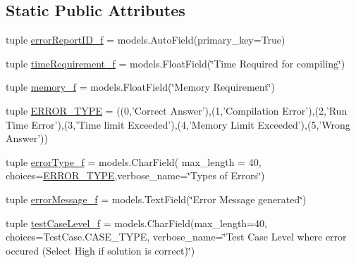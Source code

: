 \subsection*{Static Public Attributes}
\begin{DoxyCompactItemize}
\item 
tuple \hyperlink{class_ecodena_1_1_attempt_1_1models_1_1_error_report_a2af69996b9b6d05f1bdfeff5d05f1fc6}{errorReportID\_\-f} = models.AutoField(primary\_\-key=True)
\item 
tuple \hyperlink{class_ecodena_1_1_attempt_1_1models_1_1_error_report_aafea830ed4b75d8af62b447a58a23fdb}{timeRequirement\_\-f} = models.FloatField(\char`\"{}Time Required for compiling\char`\"{})
\item 
tuple \hyperlink{class_ecodena_1_1_attempt_1_1models_1_1_error_report_a6251188760c30f622c68f126ba37c765}{memory\_\-f} = models.FloatField(\char`\"{}Memory Requirement\char`\"{})
\item 
tuple \hyperlink{class_ecodena_1_1_attempt_1_1models_1_1_error_report_a83fffbd11c0969a40133740c84f41bc1}{ERROR\_\-TYPE} = ((0,'Correct Answer'),(1,'Compilation Error'),(2,'Run Time Error'),(3,'Time limit Exceeded'),(4,'Memory Limit Exceeded'),(5,'Wrong Answer'))
\item 
tuple \hyperlink{class_ecodena_1_1_attempt_1_1models_1_1_error_report_a2206247ced5f221ac3622b203c27d98a}{errorType\_\-f} = models.CharField( max\_\-length = 40, choices=\hyperlink{class_ecodena_1_1_attempt_1_1models_1_1_error_report_a83fffbd11c0969a40133740c84f41bc1}{ERROR\_\-TYPE},verbose\_\-name=\char`\"{}Types of Errors\char`\"{})
\item 
tuple \hyperlink{class_ecodena_1_1_attempt_1_1models_1_1_error_report_ac3c6ddeb8bb514c31ef17a8b2c61fbbe}{errorMessage\_\-f} = models.TextField(\char`\"{}Error Message generated\char`\"{})
\item 
tuple \hyperlink{class_ecodena_1_1_attempt_1_1models_1_1_error_report_abb78bf4e72de46a0c4d144d5e95ed80d}{testCaseLevel\_\-f} = models.CharField(max\_\-length=40, choices=TestCase.CASE\_\-TYPE, verbose\_\-name=\char`\"{}Test Case Level where error occured (Select High if solution is correct)\char`\"{})
\end{DoxyCompactItemize}
